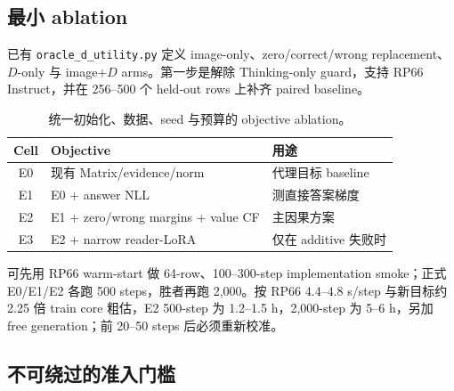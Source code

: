 \documentclass[UTF8,twocolumn,10pt,a4paper]{ctexart}
\newcommand{\code}[1]{\texttt{#1}}
\begin{document}
\subsection{最小 ablation}

已有 \code{oracle\_d\_utility.py} 定义 image-only、zero/correct/wrong replacement、$D$-only 与 image+$D$ arms。第一步是解除 Thinking-only guard，支持 RP66 Instruct，并在 256--500 个 held-out rows 上补齐 paired baseline。

\begin{table}[t]
\centering
\caption{统一初始化、数据、seed 与预算的 objective ablation。}
\label{tab:ablation}
\small
\begin{tabularx}{\columnwidth}{cYY}
\toprule
Cell & Objective & 用途 \\
\midrule
E0 & 现有 Matrix/evidence/norm & 代理目标 baseline \\
E1 & E0 + answer NLL & 测直接答案梯度 \\
E2 & E1 + zero/wrong margins + value CF & 主因果方案 \\
E3 & E2 + narrow reader-LoRA & 仅在 additive 失败时 \\
\bottomrule
\end{tabularx}
\end{table}

可先用 RP66 warm-start 做 64-row、100--300-step implementation smoke；正式 E0/E1/E2 各跑 500 steps，胜者再跑 2,000。按 RP66 4.4--4.8 s/step 与新目标约 2.25 倍 train core 粗估，E2 500-step 为 1.2--1.5 h，2,000-step 为 5--6 h，另加 free generation；前 20--50 steps 后必须重新校准。

\subsection{不可绕过的准入门槛}
\end{document}

